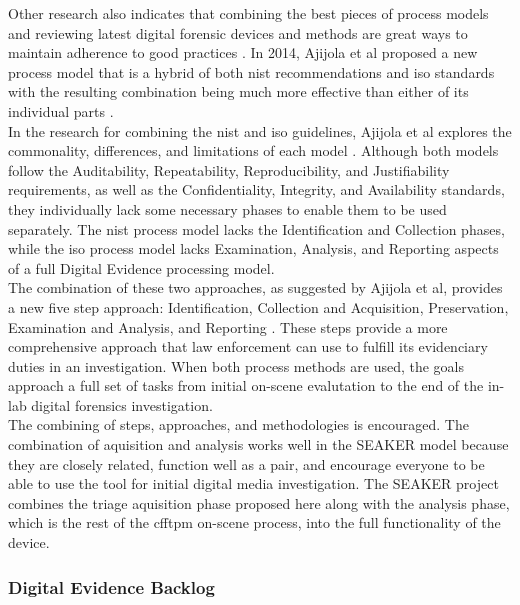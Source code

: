 \documentclass[12pt]{article}
\begin{document}
Other research also indicates that combining the best pieces of process models and reviewing
latest digital forensic devices and methods are great ways to maintain adherence to 
good practices \cite{ajijola2014review}.  In 2014, Ajijola et al proposed a new process model
that is a hybrid of both \gls{nist} recommendations and \gls{iso} standards
with the resulting combination being much more effective than either of its individual
parts \cite{ajijola2014review}.\\

In the research for combining the \gls{nist} and \gls{iso} guidelines, Ajijola et al
explores the commonality, differences, and limitations of each model \cite{ajijola2014review}.  Although both models
follow the Auditability, Repeatability, Reproducibility, and Justifiability requirements, as
well as the Confidentiality, Integrity, and Availability standards, they individually lack some
necessary phases to enable them to be used separately.  The \gls{nist} process model lacks the
Identification and Collection phases, while the \gls{iso} process model lacks Examination, Analysis,
and Reporting aspects of a full Digital Evidence processing model.\\

The combination of these two approaches, as suggested by Ajijola et al,
provides a new five step approach: Identification, Collection and Acquisition, Preservation,
Examination and Analysis, and Reporting \cite{ajijola2014review}. These steps provide a more comprehensive approach that
law enforcement can use to fulfill its evidenciary duties in an investigation.  When both
process methods are used, the goals approach a full set of tasks from initial on-scene
evalutation to the end of the in-lab digital forensics investigation.\\

The combining of steps, approaches, and methodologies is encouraged.  The combination of 
aquisition and analysis works well in the SEAKER model because they are closely related,
function well as a pair, and encourage everyone to be able to use the tool for initial digital
media investigation.  The SEAKER
project combines the triage aquisition phase proposed here along with the analysis
phase, which is the rest of the \gls{cfftpm} on-scene process, into the full functionality
of the device.\\

\subsubsection{Digital Evidence Backlog}
\end{document}
